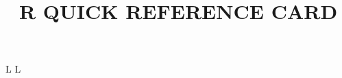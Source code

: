 
\def\versionnumber{0.1}  %
\def\year{2014}
\def\month{May}
\def\version{v\versionnumber\ \month\ \year}



\title{R QUICK REFERENCE CARD}

\shortintro



\copyrightnotice

\supereject
\if L\lr \else\null\vfill\eject\fi
\if L\lr \else\null\vfill\eject\fi
\bye

